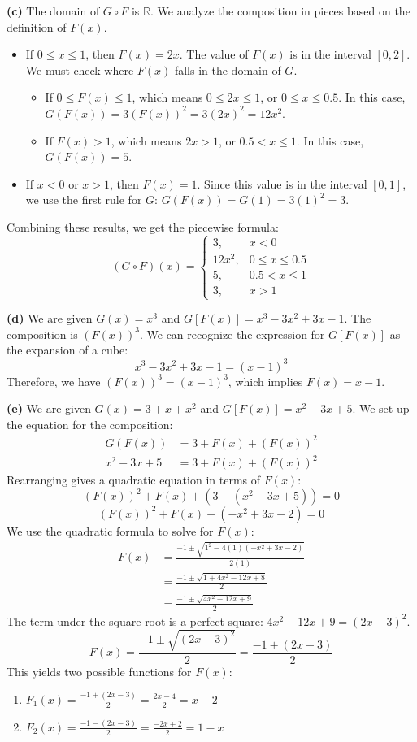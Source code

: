 \textbf{(c)}
The domain of \(G \circ F\) is \(\mathbb{R}\). We analyze the composition in pieces based on the definition of \(F(x)\).
\begin{itemize}
\item If $0 \le x \le 1$, then $F(x) = 2x$. The value of $F(x)$ is in the interval $[0, 2]$. We must check where $F(x)$ falls in the domain of $G$.
\begin{itemize}
\item If $0 \le F(x) \le 1$, which means $0 \le 2x \le 1$, or $0 \le x \le 0.5$. In this case, $G(F(x)) = 3(F(x))^2 = 3(2x)^2 = 12x^2$.
\item If $F(x) > 1$, which means $2x > 1$, or $0.5 < x \le 1$. In this case, $G(F(x)) = 5$.
\end{itemize}
\item If $x < 0$ or $x > 1$, then $F(x)=1$. Since this value is in the interval $[0,1]$, we use the first rule for $G$: $G(F(x)) = G(1) = 3(1)^2 = 3$.
\end{itemize}
Combining these results, we get the piecewise formula:
\[ (G \circ F)(x) = \begin{cases} 
3, & x < 0 \\
12x^2, & 0 \le x \le 0.5 \\
5, & 0.5 < x \le 1 \\
3, & x > 1
\end{cases}
\]

\textbf{(d)}
We are given $G(x) = x^3$ and $G[F(x)] = x^3 - 3x^2 + 3x - 1$.
The composition is $(F(x))^3$. We can recognize the expression for $G[F(x)]$ as the expansion of a cube:
\[ x^3 - 3x^2 + 3x - 1 = (x-1)^3 \]
Therefore, we have $(F(x))^3 = (x-1)^3$, which implies $F(x) = x-1$.

\textbf{(e)}
We are given $G(x) = 3 + x + x^2$ and $G[F(x)] = x^2 - 3x + 5$.
We set up the equation for the composition:
\begin{align*}
G(F(x)) &= 3 + F(x) + (F(x))^2 \\
x^2 - 3x + 5 &= 3 + F(x) + (F(x))^2
\end{align*}
Rearranging gives a quadratic equation in terms of $F(x)$:
\[ (F(x))^2 + F(x) + (3 - (x^2 - 3x + 5)) = 0 \]
\[ (F(x))^2 + F(x) + (-x^2 + 3x - 2) = 0 \]
We use the quadratic formula to solve for $F(x)$:
\begin{align*}
F(x) &= \frac{-1 \pm \sqrt{1^2 - 4(1)(-x^2+3x-2)}}{2(1)} \\
&= \frac{-1 \pm \sqrt{1 + 4x^2 - 12x + 8}}{2} \\
&= \frac{-1 \pm \sqrt{4x^2 - 12x + 9}}{2}
\end{align*}
The term under the square root is a perfect square: $4x^2 - 12x + 9 = (2x-3)^2$.
\[ F(x) = \frac{-1 \pm \sqrt{(2x-3)^2}}{2} = \frac{-1 \pm (2x-3)}{2} \]
This yields two possible functions for $F(x)$:
\begin{enumerate}
\item $F_1(x) = \frac{-1 + (2x-3)}{2} = \frac{2x-4}{2} = x-2$
\item $F_2(x) = \frac{-1 - (2x-3)}{2} = \frac{-2x+2}{2} = 1-x$
\end{enumerate}


